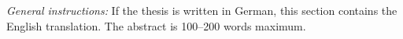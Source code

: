 {\textsl{General instructions:}}
If the thesis is written in German, this section contains the English
translation.  The abstract is 100--200 words maximum.
